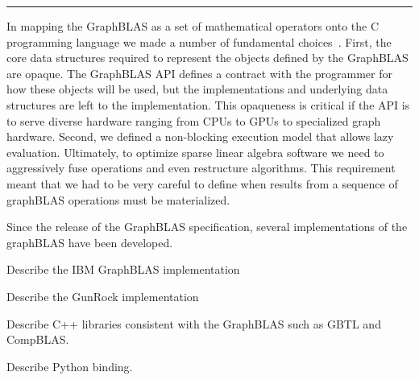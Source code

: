 \begin{table}[h]
\begin{center}
\end{center}
\hrule
\end{table}


In mapping the GraphBLAS as a set of mathematical operators onto the C programming language
we made a number of fundamental choices~\cite{cspec}.  First, the core data structures required
to represent the objects defined by the GraphBLAS are opaque.   The GraphBLAS API defines a 
contract with the programmer for how these objects will be used, but the implementations and underlying
data structures are left to the implementation.  This opaqueness is critical if the API is to serve diverse hardware
ranging from CPUs to GPUs to specialized graph hardware. Second, we defined a non-blocking  
execution model that allows lazy evaluation.  Ultimately, to optimize sparse linear algebra software we need
to aggressively fuse operations and even restructure algorithms.  This requirement meant that we had to 
be very careful to define when results from a sequence of graphBLAS operations must be materialized.

Since the release of the GraphBLAS specification, several implementations of the graphBLAS have been
developed.





Describe the IBM GraphBLAS implementation


Describe the GunRock implementation


Describe C++ libraries consistent with the GraphBLAS such as GBTL and CompBLAS.

Describe Python binding.

